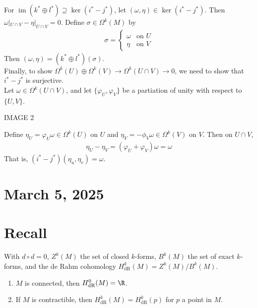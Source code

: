 \documentclass[11pt]{article}
\begin{document}
For \(\operatorname{im}(k^{*}\oplus l^{*})\supseteq\ker(i^{*}-j^{*})\), let \((\omega,\eta)\in\ker(i^{*}-j^{*})\). Then \(\omega|_{U\cap V}-\eta|_{U\cap V}=0\). Define \(\sigma\in\Omega^{k}(M)\) by\\
\begin{align*}
  \sigma=
  \begin{cases}
    \omega & \text{on } U \\
    \eta & \text{on } V
  \end{cases}
\end{align*}
Then \((\omega,\eta)=(k^{*}\oplus l^{*})(\sigma)\).\\
Finally, to show \(\Omega^{k}(U)\oplus\Omega^{k}(V)\to\Omega^{k}(U\cap V)\to 0\), we need to show that \(i^{*}-j^{*}\) is surjective.\\
Let \(\omega\in \Omega^{k}(U\cap V)\), and let \(\{\varphi_{U},\varphi_{V}\}\) be a partiation of unity with respect to \(\{U,V\}\).\\
\begin{center}
IMAGE 2\\
\end{center}
Define \(\eta_{U}=\varphi_{U}\omega\in\Omega^{k}(U)\) on \(U\) and \(\eta_{V}=-\phi_{V}\omega\in\Omega^{k}(V)\) on \(V\). Then on \(U\cap V\),\\
\begin{align*}
  \eta_{U}-\eta_{V}=(\varphi_{U}+\varphi_{V})\omega=\omega
\end{align*}
That is, \((i^{*}-j^{*})(\eta_{u},\eta_{v})=\omega\).\\
\section*{March 5, 2025}
\label{sec:org0893afc}
\section*{Recall}
\label{sec:orgfbfc9ee}
With \(d\circ d=0\), \(Z^{k}(M)\) the set of closed \(k\)-forms, \(B^{k}(M)\) the set of exact \(k\)-forms, and the de Rahm cohomology \(H^{k}_{\text{dR}}(M)=Z^{k}(M)/B^{k}(M)\).\\
\begin{enumerate}
\item \(M\) is connected, then \(H_{\text{dR}}^{0}(M)=\R\).\\
\item If \(M\) is contractible, then \(H^{k}_{\text{dR}}(M)=H_{\text{dR}}^{k}(p)\) for \(p\)  a point in \(M\).\\
\end{enumerate}
\end{document}
